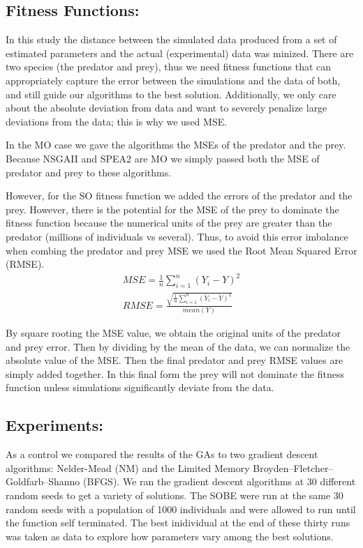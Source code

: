 \documentclass[twocolumn, 9pt]{article}
\begin{document}
\subsection{Fitness Functions:}

In this study the distance between the simulated data produced from a set of estimated parameters and the actual (experimental) data was minized. There are two species (the predator and prey), thus we need fitness functions that can appropriately capture the error between the simulations and the data of both, and still guide our algorithms to the best solution. Additionally, we only care about the absolute deviation from data and want to severely penalize large deviations from the data; this is why we used MSE.

In the MO case we gave the algorithms the MSEs of the predator and the prey. Because NSGAII and SPEA2 are MO we simply passed both the MSE of predator and prey to these algorithms.  

However, for the SO fitness function we added the errors of the predator and the prey. However, there is the potential for the MSE of the prey to dominate the fitness function because the numerical units of the prey are greater than the predator (millions of individuals vs several). Thus, to avoid this error imbalance when combing the predator and prey MSE we used the Root Mean Squared Error (RMSE).
\begin{align}
    MSE=\frac{1}{n}\sum_{i=1}^{n} (Y_i - Y)^2 \\
    RMSE=\frac{\sqrt{\frac{1}{n}\sum_{i=1}^{n} (Y_i - Y)^2}}{mean(Y)}
\end{align}

By square rooting the MSE value, we obtain the original units of the predator and prey error. Then by dividing by the mean of the data, we can normalize the absolute value of the MSE. Then the final predator and prey RMSE values are simply added together. In this final form the prey will not dominate the fitness function unless simulations significantly deviate from the data.  

\subsection{Experiments:}

As a control we compared the results of the GAs to two gradient descent algorithms: Nelder-Mead (NM) and the Limited Memory Broyden–Fletcher–Goldfarb–Shanno (BFGS). We ran the gradient descent algorithms at 30 different random seeds to get a variety of solutions. The SOBE were run at the same 30 random seeds with a population of 1000 individuals and were allowed to run until the function self terminated. The best inidividual at the end of these thirty runs was taken as data to explore how parameters vary among the best solutions.
\end{document}
